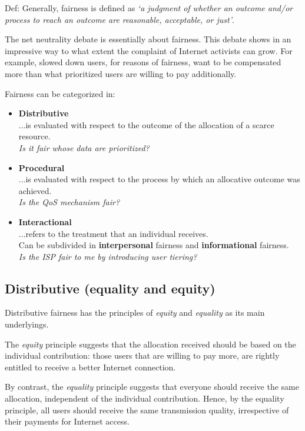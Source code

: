 
Def: Generally, fairness is defined as \emph{`a judgment of whether an outcome and/or process to reach an outcome are reasonable, acceptable, or just'}.

The net neutrality debate is essentially about fairness. This debate shows in an impressive way to what extent the complaint of Internet activists can grow. For example, slowed down users, for reasons of fairness, want to be compensated more than what prioritized users are willing to pay additionally.

Fairness can be categorized in:
\begin{itemize}
	\item \textbf{Distributive}\\
		...is evaluated with respect to the outcome of the allocation of a scarce resource.\\
		\emph{Is it fair whose data are prioritized?}

	\item \textbf{Procedural}\\
		...is evaluated with respect to the process by which an allocative outcome was achieved.\\
		\emph{Is the QoS mechanism fair?}

	\item \textbf{Interactional}\\
		...refers to the treatment that an individual receives.\\
		Can be subdivided in \textbf{interpersonal} fairness and \textbf{informational} fairness.\\
		\emph{Is the ISP fair to me by introducing user tiering?}
\end{itemize}

\subsection*{Distributive (equality and equity)}
Distributive fairness has the principles of \emph{equity} and \emph{equality} as its main underlyings.

The \emph{equity} principle suggests that the allocation received should be based on the individual contribution: those users that are willing to pay more, are rightly entitled to receive a better Internet connection.

By contrast, the \emph{equality} principle suggests that everyone should receive the same allocation, independent of the individual contribution. Hence, by the equality principle, all users should receive the same transmission quality, irrespective of their payments for Internet access.

